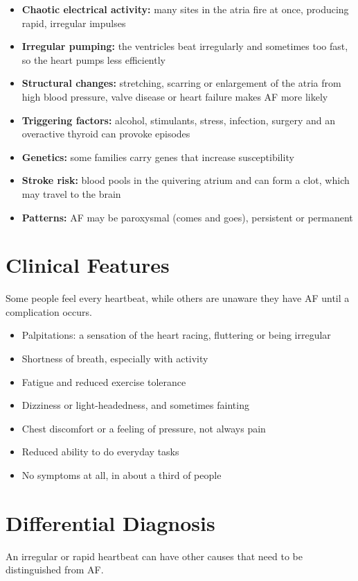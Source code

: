 \begin{itemize}
    \item \textbf{Chaotic electrical activity:} many sites in the atria fire at once, producing rapid, irregular impulses
    \item \textbf{Irregular pumping:} the ventricles beat irregularly and sometimes too fast, so the heart pumps less efficiently
    \item \textbf{Structural changes:} stretching, scarring or enlargement of the atria from high blood pressure, valve disease or heart failure makes AF more likely
    \item \textbf{Triggering factors:} alcohol, stimulants, stress, infection, surgery and an overactive thyroid can provoke episodes
    \item \textbf{Genetics:} some families carry genes that increase susceptibility
    \item \textbf{Stroke risk:} blood pools in the quivering atrium and can form a clot, which may travel to the brain
    \item \textbf{Patterns:} AF may be paroxysmal (comes and goes), persistent or permanent
\end{itemize}

\section*{Clinical Features}
Some people feel every heartbeat, while others are unaware they have AF until a complication occurs.

\begin{itemize}
    \item Palpitations: a sensation of the heart racing, fluttering or being irregular
    \item Shortness of breath, especially with activity
    \item Fatigue and reduced exercise tolerance
    \item Dizziness or light-headedness, and sometimes fainting
    \item Chest discomfort or a feeling of pressure, not always pain
    \item Reduced ability to do everyday tasks
    \item No symptoms at all, in about a third of people
\end{itemize}

\section*{Differential Diagnosis}
An irregular or rapid heartbeat can have other causes that need to be distinguished from AF.

